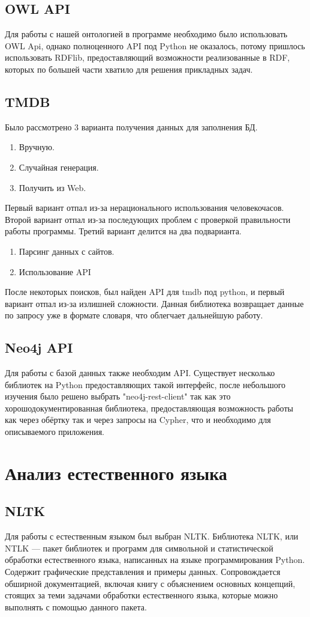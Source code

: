 \subsection{OWL API}
Для работы с нашей онтологией в программе необходимо было использовать OWL Api, однако полноценного API под Python не оказалось, потому пришлось использовать RDFlib, предоставляющий возможности реализованные в RDF, которых по большей части хватило для решения прикладных задач.
\subsection{TMDB}
Было рассмотрено 3 варианта получения данных для заполнения БД.
\begin{enumerate}
\item Вручную.
\item Случайная генерация.
\item Получить из Web.
\end{enumerate}
Первый вариант отпал из-за нерационального использования человекочасов. Второй вариант отпал из-за последующих проблем с проверкой правильности работы программы. Третий вариант делится на два подварианта.\\
\begin{enumerate}
\item Парсинг данных с сайтов.
\item Использование API
\end{enumerate}
После некоторых поисков, был найден API для tmdb под python, и первый вариант отпал из-за излишней сложности. Данная библиотека возвращает данные по запросу уже в формате словаря, что облегчает дальнейшую работу.

\subsection {Neo4j API}
Для работы с базой данных также необходим API. Существует несколько библиотек на Python предоставляющих такой интерфейс, после небольшого изучения было решено выбрать "neo4j-rest-client" так как это хорошодокументированная библиотека, предоставляющая возможность работы как через обёртку так и через запросы на Cypher, что и необходимо для описываемого приложения.
\section{Анализ естественного языка}
\subsection{NLTK}
Для работы с естественным языком был выбран NLTK.
Библиотека NLTK, или NTLK — пакет библиотек и программ для символьной и статистической обработки естественного языка, написанных на языке программирования Python. Содержит графические представления и примеры данных. Сопровождается обширной документацией, включая книгу с объяснением основных концепций, стоящих за теми задачами обработки естественного языка, которые можно выполнять с помощью данного пакета. 

